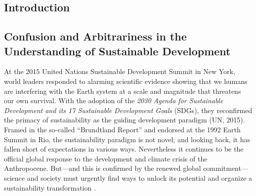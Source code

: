 \documentclass[10pt,a4paper]{article}
\begin{document}
\setlength{\parindent}{0.5cm}
\setlength{\parskip}{0cm}
\setlength{\bibsep}{0cm}

\vspace*{10mm}

\begin{multicols}{2}

\section{Introduction}
\subsection{Confusion and Arbitrariness in the Understanding of Sustainable Development}
\noindent At the 2015 United Nations Sustainable Development Summit in New York, world leaders responded to alarming scientific evidence showing that we humans are interfering with the Earth system at a scale and magnitude that threatens our own survival. With the adoption of the \textit{2030 Agenda for Sustainable Development and its 17 Sustainable Development Goals} (SDGs), they reconfirmed the primacy of sustainability as the guiding development paradigm (UN, 2015). Framed in the so-called ``Brundtland Report'' \citep{r01} and endorsed at the 1992 Earth Summit in Rio, the sustainability paradigm is not novel; and looking back, it has fallen short of expectations in various ways. Nevertheless it continues to be the official global response to the development and climate crisis of the Anthropocene. But---and this is confirmed by the renewed global commitment---science and society must urgently find ways to unlock its potential and organize a sustainability transformation \citep{r02}.


\end{multicols}
\end{document}
